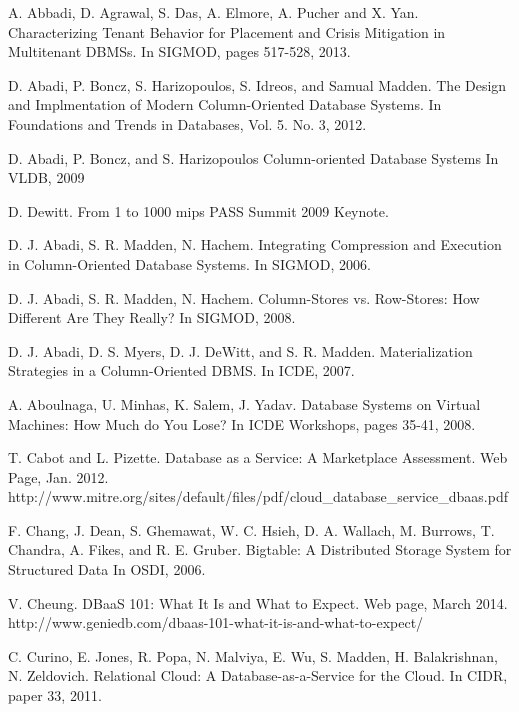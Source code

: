 
\begin{thebibliography}{1}





A. Abbadi, D. Agrawal, S. Das, A. Elmore, A. Pucher and X. Yan.
Characterizing Tenant Behavior for Placement and Crisis Mitigation in Multitenant DBMSs.
In SIGMOD, pages 517-528, 2013.


D. Abadi, P. Boncz, S. Harizopoulos, S. Idreos, and Samual Madden.
The Design and Implmentation of Modern Column-Oriented Database Systems.
In Foundations and Trends in Databases, Vol. 5. No. 3, 2012.


D. Abadi, P. Boncz, and S. Harizopoulos
Column-oriented Database Systems
In VLDB, 2009


D. Dewitt.
From 1 to 1000 mips
PASS Summit 2009 Keynote.


D. J. Abadi, S. R. Madden, N. Hachem.
Integrating Compression and Execution in Column-Oriented Database Systems.
In SIGMOD, 2006.


D. J. Abadi, S. R. Madden, N. Hachem.
Column-Stores vs. Row-Stores: How Different Are They Really?
In SIGMOD, 2008.


D. J. Abadi, D. S. Myers, D. J. DeWitt, and S. R. Madden.
Materialization Strategies in a Column-Oriented DBMS.
In ICDE, 2007.


A. Aboulnaga, U. Minhas, K. Salem, J. Yadav.
Database Systems on Virtual Machines: How Much do You Lose? 
In ICDE Workshops, pages 35-41, 2008.


T. Cabot and L. Pizette.
Database as a Service: A Marketplace Assessment.
Web Page, Jan. 2012.
http://www.mitre.org/sites/default/files/pdf/cloud\_database\_service\_dbaas.pdf


F. Chang, J. Dean, S. Ghemawat, W. C. Hsieh, D. A. Wallach, M. Burrows, T. Chandra, A. Fikes, and R. E. Gruber.
Bigtable: A Distributed Storage System for Structured Data
In OSDI, 2006.


V. Cheung.
DBaaS 101: What It Is and What to Expect.
Web page, March 2014.
http://www.geniedb.com/dbaas-101-what-it-is-and-what-to-expect/


C. Curino, E. Jones, R. Popa, N. Malviya, E. Wu, S. Madden, H. Balakrishnan, N. Zeldovich.
Relational Cloud: A Database-as-a-Service for the Cloud.
In CIDR, paper 33, 2011.



\end{thebibliography}
